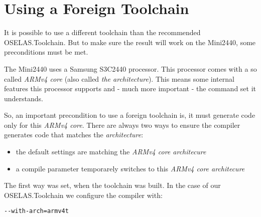 %
%
%
%
%
%

\section{Using a Foreign Toolchain}		\label{sec:foreigntoolchain}

It is possible to use a different toolchain than the recommended OSELAS.Toolchain.
But to make sure the result will work on the Mini2440, some preconditions must
be met.

The Mini2440 uses a Samsung S3C2440 processor. This processor comes with a so
called \textit{ARMv4 core} (also called \textit{the architecture}). This means
some internal features this processor supports and - much more important - the
command set it understands.

So, an important precondition to use a foreign toolchain is, it must generate
code only for this \textit{ARMv4 core}. There are always two ways to ensure the
compiler generates code that matches the \textit{architecture}:

\begin{itemize}
	\item the default settings are matching the \textit{ARMv4 core architecure}
	\item a compile parameter temporarely switches to this \textit{ARMv4 core architecure}
\end{itemize}

The first way was set, when the toolchain was built. In the case of our
OSELAS.Toolchain we configure the compiler with:

\texttt{-{}-with-arch=armv4t}

